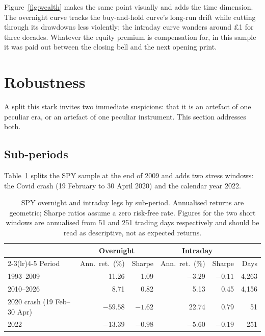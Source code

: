 \documentclass[11pt]{article}
\begin{document}
Figure~\ref{fig:wealth} makes the same point visually and adds the time dimension. The overnight curve tracks the buy-and-hold curve's long-run drift while cutting through its drawdowns less violently; the intraday curve wanders around \pounds 1 for three decades. Whatever the equity premium is compensation for, in this sample it was paid out between the closing bell and the next opening print.

\section{Robustness}
\label{sec:robust}

A split this stark invites two immediate suspicions: that it is an artefact of one peculiar era, or an artefact of one peculiar instrument. This section addresses both.

\subsection{Sub-periods}

Table~\ref{tab:subperiods} splits the SPY sample at the end of 2009 and adds two stress windows: the Covid crash (19 February to 30 April 2020) and the calendar year 2022.

\begin{table}[t]
\centering
\caption{SPY overnight and intraday legs by sub-period. Annualised returns are geometric; Sharpe ratios assume a zero risk-free rate. Figures for the two short windows are annualised from 51 and 251 trading days respectively and should be read as descriptive, not as expected returns.}
\label{tab:subperiods}
\begin{tabular}{lrrrrr}
\toprule
 & \multicolumn{2}{c}{Overnight} & \multicolumn{2}{c}{Intraday} & \\
\cmidrule(lr){2-3}\cmidrule(lr){4-5}
Period & Ann.\ ret.\ (\%) & Sharpe & Ann.\ ret.\ (\%) & Sharpe & Days \\
\midrule
1993--2009 & 11.26 & 1.09 & $-3.29$ & $-0.11$ & 4,263 \\
2010--2026 & 8.71 & 0.82 & 5.13 & 0.45 & 4,156 \\
2020 crash (19 Feb--30 Apr) & $-59.58$ & $-1.62$ & 22.74 & 0.79 & 51 \\
2022 & $-13.39$ & $-0.98$ & $-5.60$ & $-0.19$ & 251 \\
\bottomrule
\end{tabular}
\end{table}
\end{document}
